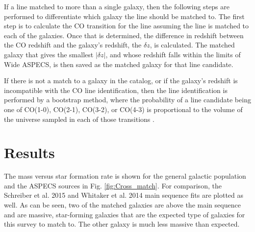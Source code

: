 If a line matched to more than a single galaxy, then the following steps are performed to differentiate which galaxy the line should be matched to. The first step is to calculate the CO transition for the line assuming the line is matched to each of the galaxies. Once that is determined, the difference in redshift between the CO redshift and the galaxy's redshift, the $\delta z$, is calculated. The matched galaxy that gives the smallest $|\delta z|$, and whose redshift falls within the limits of Wide ASPECS, is then saved as the matched galaxy for that line candidate. 

If there is not a match to a galaxy in the catalog, or if the galaxy's redshift is incompatible with the CO line identification, then the line identification is performed by a bootstrap method, where the probability of a line candidate being one of CO(1-0), CO(2-1), CO(3-2), or CO(4-3) is proportional to the volume of the universe sampled in each of those transitions \cite{walter2016alma, decarli2019alma}.

\section{Results}

The mass versus star formation rate is shown for the general galactic population and the ASPECS sources in Fig. \ref{fig:Cross_match}. For comparison, the Schreiber et al. 2015 \cite{schreiber2015herschel} and Whitaker et al. 2014 \cite{Whitaker_2014} main sequence fits are plotted as well. As can be seen, two of the matched galaxies are above the main sequence and are massive, star-forming galaxies that are the expected type of galaxies for this survey to match to. The other galaxy is much less massive than expected. 

